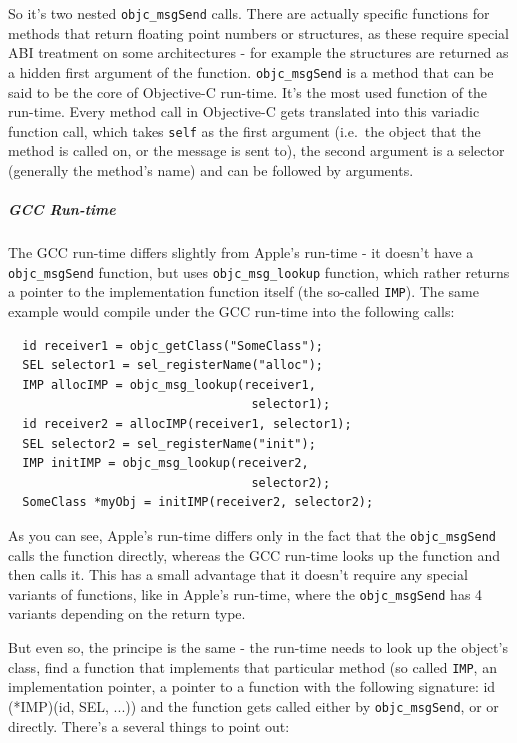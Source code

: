 So it's two nested \verb=objc_msgSend= calls. There are actually specific functions for methods that return floating point numbers or structures, as these require special ABI treatment on some architectures - for example the structures are returned as a hidden first argument of the function. \verb=objc_msgSend= is a method that can be said to be the core of Objective-C run-time. It's the most used function of the run-time. Every method call in Objective-C gets translated into this variadic function call, which takes \verb=self= as the first argument (i.e.\ the object that the method is called on, or the message is sent to), the second argument is a selector (generally the method's name) and can be followed by arguments.

\subparagraph{GCC Run-time}

The GCC run-time differs slightly from Apple's run-time - it doesn't have a \verb=objc_msgSend= function, but uses \verb=objc_msg_lookup= function, which rather returns a pointer to the implementation function itself (the so-called \verb=IMP=). The same example would compile under the GCC run-time into the following calls:

\begin{verbatim}
  id receiver1 = objc_getClass("SomeClass");
  SEL selector1 = sel_registerName("alloc");
  IMP allocIMP = objc_msg_lookup(receiver1, 
                                  selector1);
  id receiver2 = allocIMP(receiver1, selector1);
  SEL selector2 = sel_registerName("init");
  IMP initIMP = objc_msg_lookup(receiver2, 
                                  selector2);
  SomeClass *myObj = initIMP(receiver2, selector2);
\end{verbatim}

As you can see, Apple's run-time differs only in the fact that the \verb=objc_msgSend= calls the function directly, whereas the GCC run-time looks up the function and then calls it. This has a small advantage that it doesn't require any special variants of functions, like in Apple's run-time, where the \verb=objc_msgSend= has 4 variants depending on the return type.

\hspace{20pt}

But even so, the principe is the same - the run-time needs to look up the object's class, find a function that implements that particular method (so called \verb=IMP=, an implementation pointer, a pointer to a function with the following signature: id (*IMP)(id, SEL, ...)) and the function gets called either by \verb=objc_msgSend=, or or directly. There's a several things to point out:

